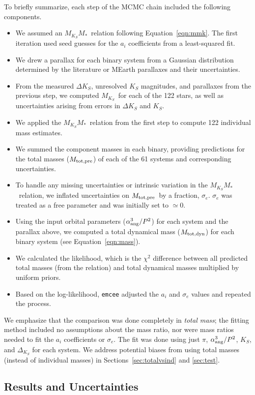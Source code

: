 \documentclass[twocolumn]{aastex62}
\newcommand{\mks}{$M_{K_S}$}
\newcommand{\mmk}{$M_{K_S}$\textendash$M_*$}
\newcommand{\mpred}{$M_{\rm{tot,pre}}$}
\newcommand{\mdyn}{$M_{\rm{tot,dyn}}$}
\begin{document}
To briefly summarize, each step of the MCMC chain included the following components. 
\begin{itemize}
\item We assumed an \mmk\ relation following Equation~\ref{eqn:mmk}. The first iteration used seed guesses for the $a_i$ coefficients from a least-squared fit. 
\item We drew a parallax for each binary system from a Gaussian distribution determined by the literature or MEarth parallaxes and their uncertainties.
\item From the measured $\Delta K_S$, unresolved $K_S$ magnitudes, and parallaxes from the previous step, we computed \mks\ for each of the 122 stars, as well as uncertainties arising from errors in $\Delta K_S$ and $K_S$.
\item We applied the \mmk\ relation from the first step to compute 122 individual mass estimates.
\item We summed the component masses in each binary, providing predictions for the total masses (\mpred) of each of the 61 systems and corresponding uncertainties.
\item To handle any missing uncertainties or intrinsic variation in the \mmk\ relation, we inflated uncertainties on \mpred\ by a fraction, $\sigma_e$. $\sigma_e$ was treated as a free parameter and was initially set to $\simeq$0. 
\item Using the input orbital parameters ($\alpha_{\rm{ang}}^3/P^2$) for each system and the parallax above, we computed a total dynamical mass (\mdyn) for each binary system (see Equation~\ref{eqn:mass}). 
\item We calculated the likelihood, which is the $\chi^2$ difference between all predicted total masses (from the relation) and total dynamical masses multiplied by uniform priors.
\item Based on the log-likelihood, {\tt emcee} adjusted the $a_i$ and $\sigma_e$ values and repeated the process.
\end{itemize}
We emphasize that the comparison was done completely in {\it total mass}; the fitting method included no assumptions about the mass ratio, nor were mass ratios needed to fit the $a_i$ coefficients or $\sigma_e$. The fit was done using just $\pi$, $\alpha_{\rm{ang}}^3/P^2$, $K_S$, and $\Delta_{K_S}$ for each system. We address potential biases from using total masses (instead of individual masses) in Sections~\ref{sec:totalvsind} and \ref{sec:test}.

\subsection{Results and Uncertainties}\label{sec:res}
\end{document}
